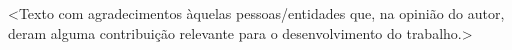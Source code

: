 \begin{agradecimentos}
\textless Texto com agradecimentos àquelas pessoas/entidades que, na opinião do autor, deram alguma contribuição relevante para o desenvolvimento do trabalho.\textgreater
\end{agradecimentos}


